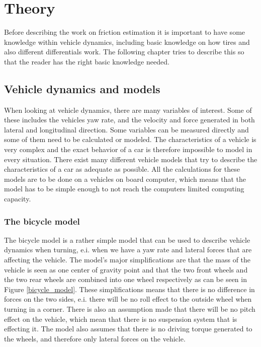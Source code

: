 \chapter{Theory}

Before describing the work on friction estimation it is important to have some knowledge within vehicle dynamics, including basic knowledge on how tires and also different differentials work. The following chapter tries to describe this so that the reader has the right basic knowledge needed.

\section{Vehicle dynamics and models}

When looking at vehicle dynamics, there are many variables of interest. Some of these includes the vehicles yaw rate, and the velocity and force generated in both lateral and longitudinal direction. Some variables can be measured directly and some of them need to be calculated or modeled. The characteristics of a vehicle is very complex and the exact behavior of a car is therefore impossible to model in every situation. There exist many different vehicle models that try to describe the characteristics of a car as adequate as possible. All the calculations for these models are to be done on a vehicles on board computer, which means that the model has to be simple enough to not reach the computers limited computing capacity.

\subsection{The bicycle model}

The bicycle model \cite{fordonsdynamik} is a rather simple model that can be used to describe vehicle dynamics when turning, e.i. when we have a yaw rate and lateral forces that are affecting the vehicle. The model's major simplifications are that the mass of the vehicle is seen as one center of gravity point and that the two front wheels and the two rear wheels are combined into one wheel respectively as can be seen in Figure \ref{bicycle_model}. These simplifications means that there is no difference in forces on the two sides, e.i. there will be no roll effect to the outside wheel when turning in a corner. There is also an assumption made that there will be no pitch effect on the vehicle, which mean that there is no suspension system that is effecting it. The model also assumes that there is no driving torque generated to the wheels, and therefore only lateral forces on the vehicle.

